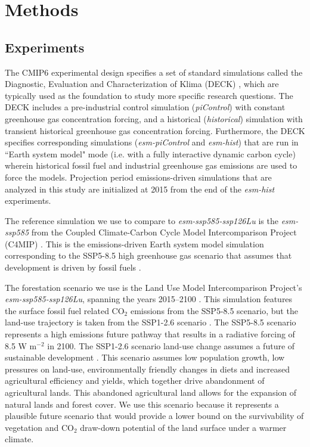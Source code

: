 \documentclass[]{article}
\begin{document}
\section{Methods}

\subsection{Experiments}

The CMIP6 experimental design specifies a set of standard simulations called the Diagnostic, Evaluation and Characterization of Klima (DECK) \parencite{eyring_overview_2016}, which are typically used as the foundation to study more specific research questions.
The DECK includes a pre-industrial control simulation (\textit{piControl}) with constant greenhouse gas concentration forcing, and a historical (\textit{historical}) simulation with transient historical greenhouse gas concentration forcing.
Furthermore, the DECK specifies corresponding simulations (\textit{esm-piControl} and \textit{esm-hist}) that are run in ``Earth system model" mode (i.e. with a fully interactive dynamic carbon cycle) wherein historical fossil fuel and industrial greenhouse gas emissions are used to force the models.
Projection period emissions-driven simulations that are analyzed in this study are initialized at 2015 from the end of the \textit{esm-hist} experiments.

The reference simulation we use to compare to \textit{esm-ssp585-ssp126Lu} is the \textit{esm-ssp585} from the Coupled Climate-Carbon Cycle Model Intercomparison Project (C4MIP) \parencite{jones_c4mip_2016}.
This is the emissions-driven Earth system model simulation corresponding to the SSP5-8.5 high greenhouse gas scenario that assumes that development is driven by fossil fuels \parencite{oneill_scenario_2016}.

The forestation scenario we use is the Land Use Model Intercomparison Project's \textit{esm-ssp585-ssp126Lu}, spanning the years 2015--2100 \parencite{lawrence_land_2016}.
This simulation features the surface fossil fuel related CO$_{2}$ emissions from the SSP5-8.5 scenario, but the land-use trajectory is taken from the SSP1-2.6 scenario \parencite{oneill_scenario_2016}.
The SSP5-8.5 scenario represents a high emissions future pathway that results in a radiative forcing of 8.5 W m$^{-2}$ in 2100.
The SSP1-2.6 scenario land-use change assumes a future of sustainable development \parencite{van_vuuren_energy_2017}.
This scenario assumes low population growth, low pressures on land-use, environmentally friendly changes in diets and increased agricultural efficiency and yields, which together drive abandonment of agricultural lands.
This abandoned agricultural land allows for the expansion of natural lands and forest cover.
We use this scenario because it represents a plausible future scenario that would provide a lower bound on the survivability of vegetation and CO$_2$ draw-down potential of the land surface under a warmer climate.
\end{document}
